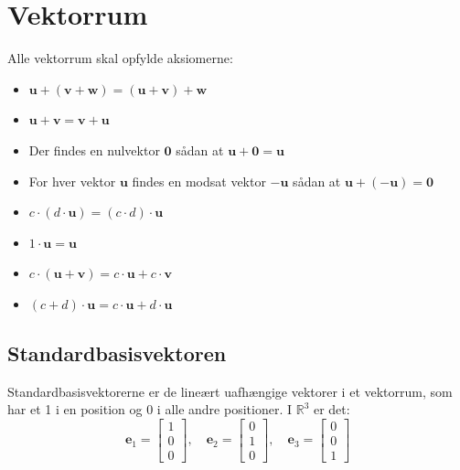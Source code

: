 \section{Vektorrum}
Alle vektorrum skal opfylde aksiomerne:
\begin{itemize}
\itemsep0em 
    \item \( \mathbf{u} + (\mathbf{v} + \mathbf{w}) = (\mathbf{u} + \mathbf{v}) + \mathbf{w} \)
    \item \( \mathbf{u} + \mathbf{v} = \mathbf{v} + \mathbf{u} \)
    \item Der findes en nulvektor \( \mathbf{0} \) sådan at \( \mathbf{u} + \mathbf{0} = \mathbf{u} \)
    \item For hver vektor \( \mathbf{u} \) findes en modsat vektor \( -\mathbf{u} \) sådan at \( \mathbf{u} + (-\mathbf{u}) = \mathbf{0} \)
    \item \( c \cdot (d \cdot \mathbf{u}) = (c \cdot d) \cdot \mathbf{u} \)
    \item \( 1 \cdot \mathbf{u} = \mathbf{u} \)
    \item \( c \cdot (\mathbf{u} + \mathbf{v}) = c \cdot \mathbf{u} + c \cdot \mathbf{v} \)
    \item \( (c + d) \cdot \mathbf{u} = c \cdot \mathbf{u} + d \cdot \mathbf{u} \)
\end{itemize}

\subsection{Standardbasisvektoren}
Standardbasisvektorerne er de lineært uafhængige vektorer i et vektorrum, som har et 1 i en position og 0 i alle andre positioner.
I \(\mathbb{R}^3\) er det:
\[\mathbf{e}_1 = \begin{bmatrix} 1 \\ 0 \\ 0 \end{bmatrix}, \quad \mathbf{e}_2 = \begin{bmatrix} 0 \\ 1 \\ 0 \end{bmatrix}, \quad \mathbf{e}_3 = \begin{bmatrix} 0 \\ 0 \\ 1 \end{bmatrix}\]


